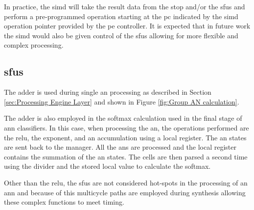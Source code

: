 In practice, the \ac{simd} will take the result data from the \ac{stop} and/or the \acp{sfu} and perform a pre-programmed operation starting at the \ac{pc} indicated by the \ac{simd} operation pointer provided by the \ac{pe} controller.
It is expected that in future work the \ac{simd} would also be given control of the \acp{sfu} allowing for more flexible and complex processing.

\subsection{\Acp{sfu}}
\label{sec:sfu}

The adder is used during single \ac{an} processing as described in Section \ref{sec:Processing Engine Layer} and shown in Figure \ref{fig:Group AN calculation}.

The adder is also employed in the softmax calculation used in the final stage of \ac{ann} classifiers.
In this case, when processing the \ac{an}, the operations performed are the \ac{relu}, the exponent, and an accumulation using a local register. The \ac{an} states are sent back to the manager.
All the \acp{an} are processed and the local register contains the summation of the \ac{an} states. 
The cells are then parsed a second time using the divider and the stored local value to calculate the softmax.

Other than the \ac{relu}, the \acp{sfu} are not considered hot-spots in the processing of an \ac{ann} and because of this multicycle paths are employed during synthesis allowing these complex functions to meet timing.


